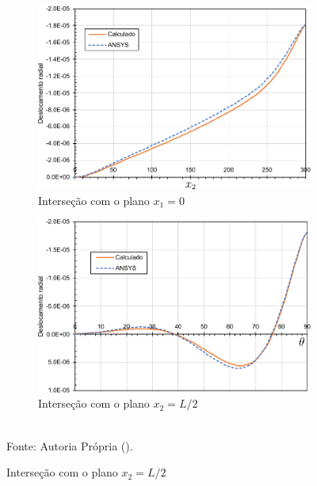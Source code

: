 \begin{figure}[h!]
    \centering
    \caption{Cilindro biengastado em problema estático - Deslocamentos radiais.}
    \begin{subfigure}{0.49\textwidth}
        \includegraphics[width=\linewidth]{Figuras/cylinder-shell/deslocamento1.pdf}
        \caption{Interseção com o plano $x_1=0$}
    \end{subfigure}
    \begin{subfigure}{0.49\textwidth}
        \includegraphics[width=\linewidth]{Figuras/cylinder-shell/deslocamento2.pdf}
        \caption{Interseção com o plano $x_2=L/2$}
    \end{subfigure}
    \\Fonte: Autoria Própria (\the\year).
    \label{fig:cylinder-shell-deslradial}
\end{figure}

